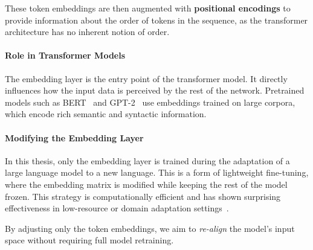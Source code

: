 These token embeddings are then augmented with \textbf{positional encodings} to provide information about the order of tokens in the sequence, as the transformer architecture has no inherent notion of order.

\paragraph{Role in Transformer Models} The embedding layer is the entry point of the transformer model. It directly influences how the input data is perceived by the rest of the network. Pretrained models such as BERT~\cite{devlin2018bert} and GPT-2~\cite{radford2019language} use embeddings trained on large corpora, which encode rich semantic and syntactic information.

\paragraph{Modifying the Embedding Layer} In this thesis, only the embedding layer is trained during the adaptation of a large language model to a new language. This is a form of lightweight fine-tuning, where the embedding matrix is modified while keeping the rest of the model frozen. This strategy is computationally efficient and has shown surprising effectiveness in low-resource or domain adaptation settings~\cite{artetxe2020cross}.

By adjusting only the token embeddings, we aim to \textit{re-align} the model’s input space without requiring full model retraining.

